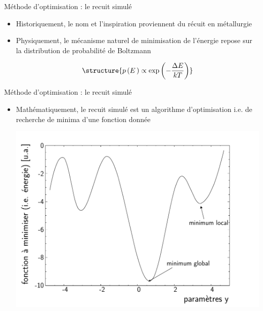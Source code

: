 \documentclass[t, compress]{beamer}
\begin{document}
\begin{frame}[c, fragile]{Méthode d'optimisation : le recuit simulé}

  \begin{itemize}
  \item Historiquement, le nom et l'inspiration proviennent du récuit en
    métallurgie
  \item Physiquement, le mécanisme naturel de minimisation de
    l'énergie repose sur la distribution de probabilité de Boltzmann


    \begin{equation*}
      \structure{p\,(E\,)\propto\exp\left(-\frac{\Delta E}{kT}\right)}
    \end{equation*}

  \end{itemize}

\end{frame}


\begin{frame}[c, fragile]{Méthode d'optimisation : le recuit simulé}

  \begin{itemize}

  \item Mathématiquement, le recuit simulé est un algorithme
    d'optimisation i.e. de recherche de minima d'une fonction donnée

    \begin{center}
      \includegraphics[scale=0.5]{figures/sam_0}
    \end{center}

  \end{itemize}

\end{frame}
\end{document}
